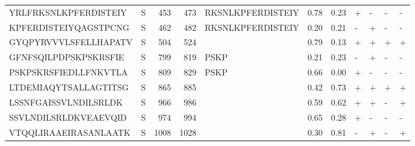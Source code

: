 \begin{tabular}{llrrlrrllll}
YRLFRKSNLKPFERDISTEIY &       S &    453 &   473 &  RKSNLKPFERDISTEIY &            0.78 &             0.23 &      + &       - &      - &       - \\
KPFERDISTEIYQAGSTPCNG &       S &    462 &   482 &  RKSNLKPFERDISTEIY &            0.20 &             0.21 &      - &       + &      - &       - \\
GYQPYRVVVLSFELLHAPATV &       S &    504 &   524 &                    &            0.79 &             0.13 &      + &       + &      + &       + \\
GFNFSQILPDPSKPSKRSFIE &       S &    799 &   819 &               PSKP &            0.21 &             0.23 &      - &       + &      - &       - \\
PSKPSKRSFIEDLLFNKVTLA &       S &    809 &   829 &               PSKP &            0.66 &             0.00 &      + &       - &      - &       - \\
LTDEMIAQYTSALLAGTITSG &       S &    865 &   885 &                    &            0.42 &             0.73 &      + &       + &      + &       + \\
LSSNFGAISSVLNDILSRLDK &       S &    966 &   986 &                    &            0.59 &             0.62 &      + &       + &      - &       + \\
SSVLNDILSRLDKVEAEVQID &       S &    974 &   994 &                    &            0.65 &             0.28 &      + &       - &      - &       - \\
VTQQLIRAAEIRASANLAATK &       S &   1008 &  1028 &                    &            0.30 &             0.81 &      - &       + &      - &       + \\
\bottomrule
\end{tabular}

